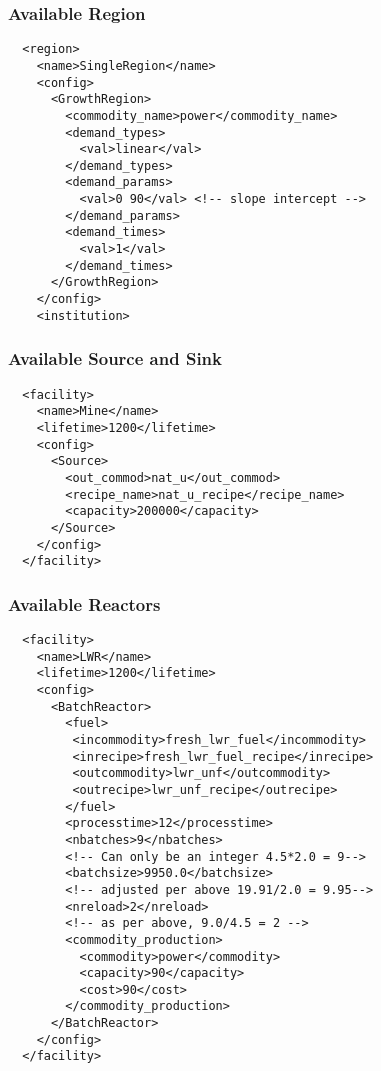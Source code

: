 \begin{frame}[fragile]
  \frametitle{Available Region}
\footnotesize{
  \begin{lstlisting}
  <region>
    <name>SingleRegion</name>
    <config>
      <GrowthRegion>
        <commodity_name>power</commodity_name>
        <demand_types>
          <val>linear</val>
        </demand_types>
        <demand_params>
          <val>0 90</val> <!-- slope intercept -->
        </demand_params>
        <demand_times>
          <val>1</val>
        </demand_times>
      </GrowthRegion>
    </config>
    <institution>
\end{lstlisting}
}
\end{frame}
\begin{frame}[fragile]
  \frametitle{Available Source and Sink}
  \begin{lstlisting}
  <facility>
    <name>Mine</name>
    <lifetime>1200</lifetime>
    <config>
      <Source>
        <out_commod>nat_u</out_commod>
        <recipe_name>nat_u_recipe</recipe_name>
        <capacity>200000</capacity>
      </Source>
    </config>
  </facility>
\end{lstlisting}
\end{frame} 
\begin{frame}[fragile]
  \frametitle{Available Reactors}
  \footnotesize{
\begin{lstlisting}
  <facility>
    <name>LWR</name>
    <lifetime>1200</lifetime>
    <config>
      <BatchReactor>
        <fuel>
         <incommodity>fresh_lwr_fuel</incommodity>
         <inrecipe>fresh_lwr_fuel_recipe</inrecipe>
         <outcommodity>lwr_unf</outcommodity>
         <outrecipe>lwr_unf_recipe</outrecipe>
        </fuel>
        <processtime>12</processtime>
        <nbatches>9</nbatches> 
        <!-- Can only be an integer 4.5*2.0 = 9-->
        <batchsize>9950.0</batchsize> 
        <!-- adjusted per above 19.91/2.0 = 9.95-->
        <nreload>2</nreload> 
        <!-- as per above, 9.0/4.5 = 2 -->
        <commodity_production>
          <commodity>power</commodity>
          <capacity>90</capacity>
          <cost>90</cost>
        </commodity_production>
      </BatchReactor>
    </config>
  </facility>
\end{lstlisting}
  }
\end{frame}
